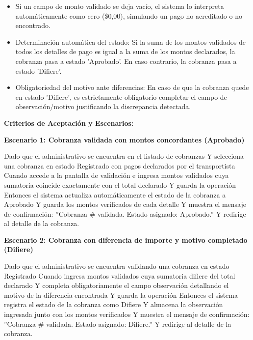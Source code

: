 \documentclass[a4paper,9pt]{article}
\begin{document}
\begin{tcolorbox}[hucard, title={\textbf{HU-49: VALIDAR COBRANZA} \hfill \scriptsize \colorbox{bluestatus}{\textbf{\ New\ }} \quad \colorbox{white}{\textcolor{primarydark}{\textbf{\ 5 pts\ }}}}]
{\begin{itemize}[leftmargin=12pt, nosep, itemsep=1.5pt, topsep=1pt]
\item Si un campo de monto validado se deja vacío, el sistema lo interpreta automáticamente como cero (\$0,00), simulando un pago no acreditado o no encontrado.
\item Determinación automática del estado: Si la suma de los montos validados de todos los detalles de pago es igual a la suma de los montos declarados, la cobranza pasa a estado 'Aprobado'. En caso contrario, la cobranza pasa a estado 'Difiere'.
\item Obligatoriedad del motivo ante diferencias: En caso de que la cobranza quede en estado 'Difiere', es estrictamente obligatorio completar el campo de observación/motivo justificando la discrepancia detectada.
\end{itemize}
}\par\vspace{3pt}
\noindent\textbf{\footnotesize Criterios de Aceptación y Escenarios:}\par\vspace{2pt}
{\footnotesize
\noindent\textbf{\textcolor{secondarydark}{Escenario 1:  Cobranza validada con montos concordantes (Aprobado)}}\par\vspace{1pt}
Dado que el administrativo se encuentra en el listado de cobranzas Y selecciona una cobranza en estado Registrado con pagos declarados por el transportista Cuando accede a la pantalla de validación e ingresa montos validados cuya sumatoria coincide exactamente con el total declarado Y guarda la operación Entonces el sistema actualiza automáticamente el estado de la cobranza a Aprobado Y guarda los montos verificados de cada detalle Y muestra el mensaje de confirmación: ''Cobranza \# validada. Estado asignado: Aprobado.'' Y redirige al detalle de la cobranza.\par\vspace{2.5pt}
\noindent\textbf{\textcolor{secondarydark}{Escenario 2:  Cobranza con diferencia de importe y motivo completado (Difiere)}}\par\vspace{1pt}
Dado que el administrativo se encuentra validando una cobranza en estado Registrado Cuando ingresa montos validados cuya sumatoria difiere del total declarado Y completa obligatoriamente el campo observación detallando el motivo de la diferencia encontrada Y guarda la operación Entonces el sistema registra el estado de la cobranza como Difiere Y almacena la observación ingresada junto con los montos verificados Y muestra el mensaje de confirmación: ''Cobranza \# validada. Estado asignado: Difiere.'' Y redirige al detalle de la cobranza.\par\vspace{2.5pt}
}
\end{tcolorbox}
\end{document}

